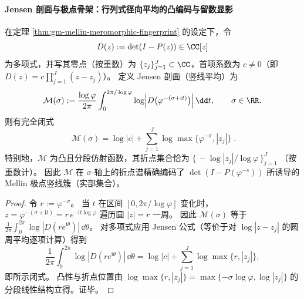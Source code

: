 \paragraph{Jensen 剖面与极点骨架：行列式径向平均的凸编码与留数显影}
\begin{proposition}\label{prop:gm-mellin-jensen-profile-det}
在定理 \ref{thm:gm-mellin-meromorphic-fingerprint} 的设定下，令
\[
D(z):=\det(I-P(z))\in\CC[z]
\]
为多项式，并写其零点（按重数）为 \(\{z_j\}_{j=1}^{J}\subset\CC\)，首项系数为 \(c\neq 0\)（即 \(D(z)=c\prod_{j=1}^{J}(z-z_j)\)）。
定义 Jensen 剖面（竖线平均）为
\[
\mathcal{M}(\sigma)
:=\frac{\log\varphi}{2\pi}\int_{0}^{2\pi/\log\varphi}
\log\Bigl|D\bigl(\varphi^{-(\sigma+\mathrm{i}t)}\bigr)\Bigr|\,\dd t,
\qquad \sigma\in\RR.
\]
则有完全闭式
\[
\boxed{\;
\mathcal{M}(\sigma)=\log|c|+\sum_{j=1}^{J}\log\max\!\bigl\{\varphi^{-\sigma},|z_j|\bigr\}\; }.
\]
特别地，\(\mathcal{M}\) 为凸且分段仿射函数，其折点集合恰为
\(
\{\,-\log|z_j|/\log\varphi\,\}_{j=1}^{J}
\)
（按重数计）。
因此 \(\mathcal{M}\) 在 \(\sigma\)-轴上的折点谱精确编码了
\(\det(I-P(\varphi^{-s}))\)
所诱导的 Mellin 极点竖线簇（实部集合）。
\end{proposition}
\begin{proof}
令 \(r:=\varphi^{-\sigma}\)。
当 \(t\) 在区间 \([0,2\pi/\log\varphi]\) 变化时，
\(
z=\varphi^{-(\sigma+\mathrm{i}t)}=r\,e^{-\mathrm{i}t\log\varphi}
\)
遍历圆 \(|z|=r\) 一周。
因此 \(\mathcal{M}(\sigma)\) 等于 \(\frac{1}{2\pi}\int_{0}^{2\pi}\log|D(re^{\mathrm{i}\theta})|\,\dd\theta\)。
对多项式应用 Jensen 公式（等价于对 \(\log|z-z_j|\) 的圆周平均逐项计算）得到
\[
\frac{1}{2\pi}\int_{0}^{2\pi}\log|D(re^{\mathrm{i}\theta})|\,\dd\theta
=\log|c|+\sum_{j=1}^{J}\log\max\{r,|z_j|\},
\]
即所示闭式。
凸性与折点位置由 \(\log\max\{r,|z_j|\}=\max\{-\sigma\log\varphi,\log|z_j|\}\) 的分段线性结构立得。证毕。
\end{proof}


